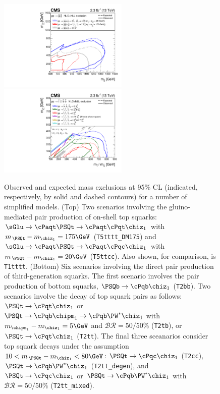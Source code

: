 \begin{figure}[h!]
  \begin{center}
    \includegraphics[width=0.55\textwidth]{figures/limits/v3/naturalWT1SUMMARY.pdf}
    \includegraphics[width=0.55\textwidth]{figures/limits/v3/allThirdGenSUMMARY.pdf} 
    \caption{ Observed and expected mass exclusions at 95\% CL
      (indicated, respectively, by solid and dashed contours) for a
      number of simplified models. (Top) Two scenarios involving the
      gluino-mediated pair production of on-shell top squarks:
      $\sGlu\ra\cPaqt\PSQt\ra\cPaqt\cPqt\chiz_1$ with $m_{\,\PSQt} -
      m_{\chiz_1} = 175\GeV$ (\texttt{T5tttt\_DM175}) and
      $\sGlu\ra\cPaqt\PSQt\ra\cPaqt\cPqc\chiz_1$ with $m_{\,\PSQt} -
      m_{\chiz_1} = 20\GeV$ (\texttt{T5ttcc}). Also shown, for
      comparison, is \texttt{T1tttt}. (Bottom) Six scenarios involving
      the direct pair production of third-generation squarks. The
      first scenario involves the pair production of bottom squarks,
      $\PSQb\ra\cPqb\chiz_1$ (\texttt{T2bb}). Two scenarios involve
      the decay of top squark pairs as follows: $\PSQt\ra\cPqt\chiz_1$
      or $\PSQt\ra\cPqb\chipm_1\ra\cPqb\PW^*\chiz_1$ with
      $m_{\chipm_1} - m_{\chiz_1} = 5\GeV$ and $\mathcal{BR} =
      50/50\%$ (\texttt{T2tb}), or $\PSQt\ra\cPqt\chiz_1$
      (\texttt{T2tt}). The final three sceanarios consider top squark
      decays under the assumption $10 < m_{\,\PSQt} - m_{\chiz_1} <
      80\GeV$: $\PSQt\ra\cPqc\chiz_1$ (\texttt{T2cc}),
      $\PSQt\ra\cPqb\PW^*\chiz_1$ (\texttt{T2tt\_degen}), and
      $\PSQt\ra\cPqc\chiz_1$ or $\PSQt\ra\cPqb\PW^*\chiz_1$ with
      $\mathcal{BR} = 50/50\%$ (\texttt{T2tt\_mixed}).  }
    \label{fig:limits-sms-2} 
  \end{center} 
\end{figure}

